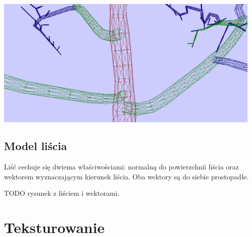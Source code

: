 \begin{center}
	\includegraphics[width=130mm]{images/model/branching.png}
	\label{branching}
\end{center}
\subsection{Model liścia}
Liść cechuje się dwiema właściwościami: normalną do powierzchnii liścia oraz wektorem wyznaczającym kierunek liścia. Oba wektory są do siebie prostopadłe.

TODO rysunek z liściem i wektorami.

\section{Teksturowanie}
